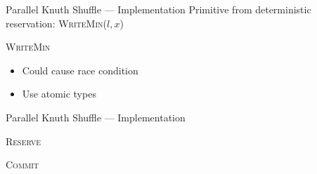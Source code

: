 \begin{frame}{Parallel Knuth Shuffle --- Implementation}
  Primitive from deterministic reservation: \textsc{WriteMin(\(l, x\))}
  \begin{algorithm}[H]
    \caption{\textsc{WriteMin}}
    \begin{algorithmic}
    \end{algorithmic}
  \end{algorithm}

  \begin{itemize}
    \item Could cause race condition
    \item Use atomic types
  \end{itemize}
\end{frame}

\begin{frame}{Parallel Knuth Shuffle --- Implementation}
  \begin{algorithm}[H]
    \caption{\textsc{Reserve}}
    \begin{algorithmic}
    \end{algorithmic}
  \end{algorithm}
  \vspace{-1.5em}
  \begin{algorithm}[H]
    \caption{\textsc{Commit}}
    \begin{algorithmic}
      \EndIf
    \end{algorithmic}
  \end{algorithm}
\end{frame}

